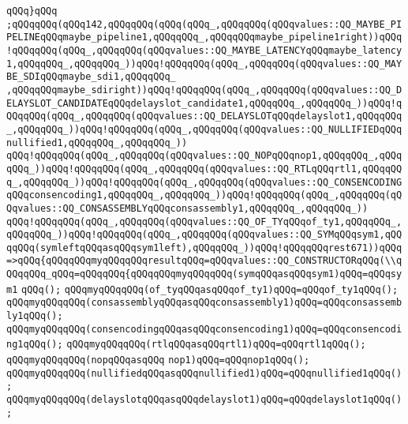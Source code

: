 \verb|qQQq}qQQq|\newline
\verb|;qQQqqQQq(qQQq142,qQQqqQQq(qQQq(qQQq_,qQQqqQQq(qQQqvalues::QQ_MAYBE_PIPELINEqQQqmaybe_pipeline1,qQQqqQQq_,qQQqqQQqmaybe_pipeline1right))qQQq!qQQqqQQq(qQQq_,qQQqqQQq(qQQqvalues::QQ_MAYBE_LATENCYqQQqmaybe_latency1,qQQqqQQq_,qQQqqQQq_))qQQq!qQQqqQQq(qQQq_,qQQqqQQq(qQQqvalues::QQ_MAYBE_SDIqQQqmaybe_sdi1,qQQqqQQq_|\newline
\verb|,qQQqqQQqmaybe_sdiright))qQQq!qQQqqQQq(qQQq_,qQQqqQQq(qQQqvalues::QQ_DELAYSLOT_CANDIDATEqQQqdelayslot_candidate1,qQQqqQQq_,qQQqqQQq_))qQQq!qQQqqQQq(qQQq_,qQQqqQQq(qQQqvalues::QQ_DELAYSLOTqQQqdelayslot1,qQQqqQQq_,qQQqqQQq_))qQQq!qQQqqQQq(qQQq_,qQQqqQQq(qQQqvalues::QQ_NULLIFIEDqQQqnullified1,qQQqqQQq_,qQQqqQQq_))|\newline
\verb|qQQq!qQQqqQQq(qQQq_,qQQqqQQq(qQQqvalues::QQ_NOPqQQqnop1,qQQqqQQq_,qQQqqQQq_))qQQq!qQQqqQQq(qQQq_,qQQqqQQq(qQQqvalues::QQ_RTLqQQqrtl1,qQQqqQQq_,qQQqqQQq_))qQQq!qQQqqQQq(qQQq_,qQQqqQQq(qQQqvalues::QQ_CONSENCODINGqQQqconsencoding1,qQQqqQQq_,qQQqqQQq_))qQQq!qQQqqQQq(qQQq_,qQQqqQQq(qQQqvalues::QQ_CONSASSEMBLYqQQqconsassembly1,qQQqqQQq_,qQQqqQQq_))|\newline
\verb|qQQq!qQQqqQQq(qQQq_,qQQqqQQq(qQQqvalues::QQ_OF_TYqQQqof_ty1,qQQqqQQq_,qQQqqQQq_))qQQq!qQQqqQQq(qQQq_,qQQqqQQq(qQQqvalues::QQ_SYMqQQqsym1,qQQqqQQq(symleftqQQqasqQQqsym1left),qQQqqQQq_))qQQq!qQQqqQQqrest671))qQQq=>qQQq{qQQqqQQqmyqQQqqQQqresultqQQq=qQQqvalues::QQ_CONSTRUCTORqQQq(\\qQQqqQQq_qQQq=qQQqqQQq{qQQqqQQqmyqQQqqQQq(symqQQqasqQQqsym1)qQQq=qQQqsym1|\newline
\verb|qQQq();|\newline
\verb|qQQqmyqQQqqQQq(of_tyqQQqasqQQqof_ty1)qQQq=qQQqof_ty1qQQq();|\newline
\verb|qQQqmyqQQqqQQq(consassemblyqQQqasqQQqconsassembly1)qQQq=qQQqconsassembly1qQQq();|\newline
\verb|qQQqmyqQQqqQQq(consencodingqQQqasqQQqconsencoding1)qQQq=qQQqconsencoding1qQQq();|\newline
\verb|qQQqmyqQQqqQQq(rtlqQQqasqQQqrtl1)qQQq=qQQqrtl1qQQq();|\newline
\verb|qQQqmyqQQqqQQq(nopqQQqasqQQq|\newline
\verb|nop1)qQQq=qQQqnop1qQQq();|\newline
\verb|qQQqmyqQQqqQQq(nullifiedqQQqasqQQqnullified1)qQQq=qQQqnullified1qQQq();|\newline
\verb|qQQqmyqQQqqQQq(delayslotqQQqasqQQqdelayslot1)qQQq=qQQqdelayslot1qQQq();|\newline
